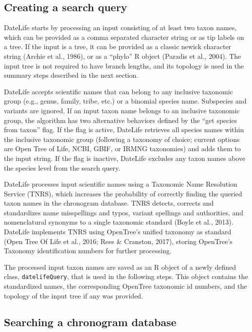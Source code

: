 \documentclass[
  english,
  man]{apa6}
\begin{document}
\hypertarget{creating-a-search-query}{%
\subsection{Creating a search query}\label{creating-a-search-query}}

DateLife starts by processing an input consisting of at least two taxon names, which can be provided as a comma separated character string or as tip labels on a tree.
If the input is a tree, it can be provided as a classic newick character string (Archie et al., 1986), or as a ``phylo'' R object (Paradis et al., 2004).
The input tree is not required to have branch lengths, and its topology is used in the summary steps described in the next section.

DateLife accepts scientific names that can belong to any inclusive taxonomic group (e.g., genus, family, tribe, etc.) or a binomial species name. Subspecies and variants are ignored. If an input taxon name belongs to an inclusive taxonomic group, the algorithm has two alternative behaviors defined by the ``get species from taxon'' flag. If the flag is active, DateLife retrieves all species names within the inclusive taxonomic group (following a taxonomy of choice; current options are Open Tree of Life, NCBI, GBIF, or IRMNG taxonomies) and adds them to the input string.
If the flag is inactive, DateLife excludes any taxon names above the species level from the search query.

DateLife processes input scientific names using a Taxonomic Name Resolution Service (TNRS), which increases the probability of correctly finding the queried taxon names in the chronogram database. TNRS detects, corrects and standardizes name misspellings and typos, variant spellings and authorities, and nomenclatural synonyms to a single taxonomic standard (Boyle et al., 2013). DateLife implements TNRS using OpenTree's unified taxonomy as standard (Open Tree Of Life et al., 2016; Rees \& Cranston, 2017), storing OpenTree's Taxonomy identification numbers for further processing.

The processed input taxon names are saved as an R object of a newly defined class, \texttt{datelifeQuery}, that is used in the following steps. This object contains the standardized names, the corresponding OpenTree taxonomic id numbers, and the topology of the input tree if any was provided.

\hypertarget{searching-a-chronogram-database}{%
\subsection{Searching a chronogram database}\label{searching-a-chronogram-database}}
\end{document}
